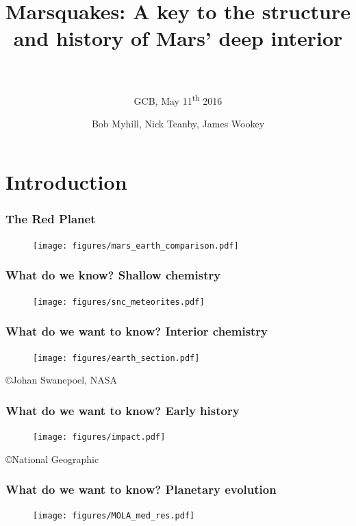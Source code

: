 \documentclass[compress,framenumber]{beamer}
\title{Marsquakes: A key to the structure and history of Mars' deep interior
\\$\,$}
\subtitle{GCB, May 11\textsuperscript{th} 2016}
\author{\hfill{Bob Myhill, Nick Teanby, James Wookey}}
\begin{document}
\begin{frame} 
\titlepage
\vspace{-1.0em}
\end{frame}


\section{Introduction}

\begin{frame}
  \frametitle{The Red Planet}
  \vspace{-2.0em}
  \begin{figure}
    \texttt{[image: figures/mars\_earth\_comparison.pdf]}
  \end{figure}

\end{frame}

\begin{frame}
  \frametitle{What do we know? Shallow chemistry}
  \vspace{-2.0em}
  \begin{figure}
    \texttt{[image: figures/snc\_meteorites.pdf]}
  \end{figure}
\end{frame}

\begin{frame}
  \frametitle{What do we want to know? Interior chemistry}
  \vspace{-2.0em}
  \begin{figure}
    \texttt{[image: figures/earth\_section.pdf]}
  \end{figure}
  \vspace{-1.0em}
  \hfill \copyright Johan Swanepoel, NASA
\end{frame}

\begin{frame}
  \frametitle{What do we want to know? Early history}
  \vspace{-2.0em}
  \begin{figure}
    \texttt{[image: figures/impact.pdf]}
  \end{figure}
  \hfill \copyright National Geographic
\end{frame}

\begin{frame}
  \frametitle{What do we want to know? Planetary evolution}
  \vspace{-2.0em}
  \begin{figure}
    \texttt{[image: figures/MOLA\_med\_res.pdf]}
  \end{figure}
\end{frame}
\end{document}
